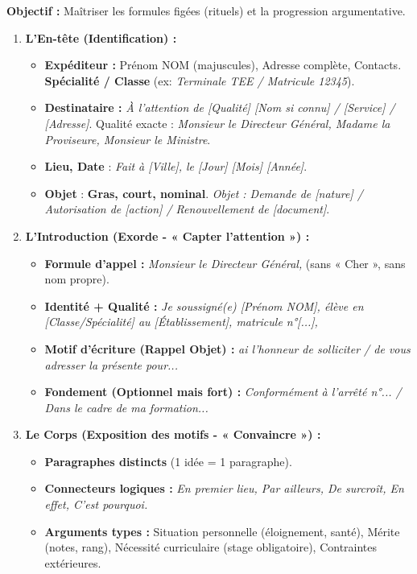 \documentclass[11pt]{article}
\begin{document}
\begin{methode}
\textbf{Objectif :} Maîtriser les formules figées (rituels) et la progression argumentative.
\begin{enumerate}
    \item \textbf{L'En-tête (Identification) :}
    \begin{itemize}
        \item \textbf{Expéditeur :} Prénom NOM (majuscules), Adresse complète, Contacts. \textbf{Spécialité / Classe} (ex: \emph{Terminale TEE / Matricule 12345}).
        \item \textbf{Destinataire :} \emph{À l'attention de [Qualité] [Nom si connu] / [Service] / [Adresse]}. Qualité exacte : \emph{Monsieur le Directeur Général, Madame la Proviseure, Monsieur le Ministre}.
        \item \textbf{Lieu, Date} : \emph{Fait à [Ville], le [Jour] [Mois] [Année]}.
        \item \textbf{Objet} : \textbf{Gras, court, nominal}. \emph{Objet : Demande de [nature] / Autorisation de [action] / Renouvellement de [document]}.
    \end{itemize}
    \item \textbf{L'Introduction (Exorde - « Capter l'attention ») :}
    \begin{itemize}
        \item \textbf{Formule d'appel :} \emph{Monsieur le Directeur Général,} (sans « Cher », sans nom propre).
        \item \textbf{Identité + Qualité :} \emph{Je soussigné(e) [Prénom NOM], élève en [Classe/Spécialité] au [Établissement], matricule n°[...],} 
        \item \textbf{Motif d'écriture (Rappel Objet) :} \emph{ai l'honneur de solliciter / de vous adresser la présente pour...}
        \item \textbf{Fondement (Optionnel mais fort) :} \emph{Conformément à l'arrêté n°... / Dans le cadre de ma formation...}
    \end{itemize}
    \item \textbf{Le Corps (Exposition des motifs - « Convaincre ») :}
    \begin{itemize}
        \item \textbf{Paragraphes distincts} (1 idée = 1 paragraphe).
        \item \textbf{Connecteurs logiques :} \emph{En premier lieu, Par ailleurs, De surcroît, En effet, C'est pourquoi.}
        \item \textbf{Arguments types :} Situation personnelle (éloignement, santé), Mérite (notes, rang), Nécessité curriculaire (stage obligatoire), Contraintes extérieures.

\end{itemize}
\end{enumerate}
\end{methode}
\end{document}
